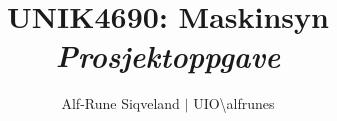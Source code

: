 \author{Alf-Rune Siqveland $|$ UIO\textbackslash{}alfrunes}
\title{UNIK4690: Maskinsyn \\ \textit{Prosjektoppgave}}

\maketitle